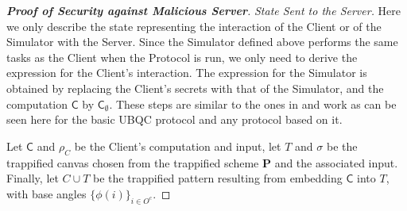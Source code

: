 \documentclass[12pt]{iopart}
\newcommand{\cptp}[1]{\mathsf{#1}} \newcommand{\pd}[1]{\mathcal{#1}}  \newcommand{\sch}[1]{\bm{#1}}
\renewcommand{\1}{\mathds{1}}
\newcommand{\TP}{C\cup T}
\begin{document}
\begin{proof}[\bf Proof of Security against Malicious Server]
\textit{State Sent to the Server.}
Here we only describe the state representing the interaction of the Client or of the Simulator with the Server. Since the Simulator defined above performs the same tasks as the Client when the Protocol is run, we only need to derive the expression for the Client's interaction. The expression for the Simulator is obtained by replacing the Client's secrets with that of the Simulator, and the computation $\cptp C$ by $\cptp C_\emptyset$. These steps are similar to the ones in \cite[Proof of Theorem 3]{FKD18:reducing} and work as can be seen here for the basic UBQC protocol and any protocol based on it.

Let $\cptp C$ and $\rho_C$ be the Client's computation and input, let $T$ and $\sigma$ be the trappified canvas chosen from the trappified scheme $\sch P$ and the associated input. Finally, let $\TP$ be the trappified pattern resulting from embedding $\cptp C$ into $T$, with base angles $\{\phi(i)\}_{i \in O^c}$. 


\end{proof}
\end{document}
